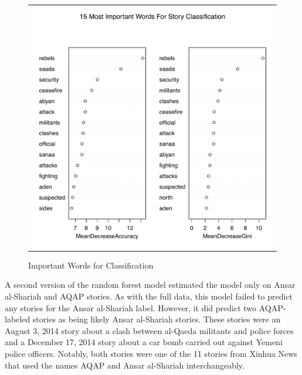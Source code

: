  
\begin{figure}
\begin{center}
\begin{tabular}{c}
  \includegraphics[width=5.00in]{./Pictures/randomForestRes.pdf}\\
\end{tabular}
\caption{Important Words for Classification}
\label{fig:rf-impt}
\end{center}
 \end{figure}

A second version of the random forest model estimated the model only on Ansar al-Shariah and AQAP stories. As with the full data, this
model failed to predict any stories for the Ansar al-Shariah
label. However, it did predict two AQAP-labeled stories as being
likely Ansar al-Shariah stories. These stories were an August 3, 2014
story about a clash between al-Qaeda militants and police forces and a
December 17, 2014 story about a car bomb carried out against Yemeni
police officers. Notably, both stories were one of the 11 stories from
Xinhua News that used the names AQAP and Ansar al-Shariah
interchangeably.

